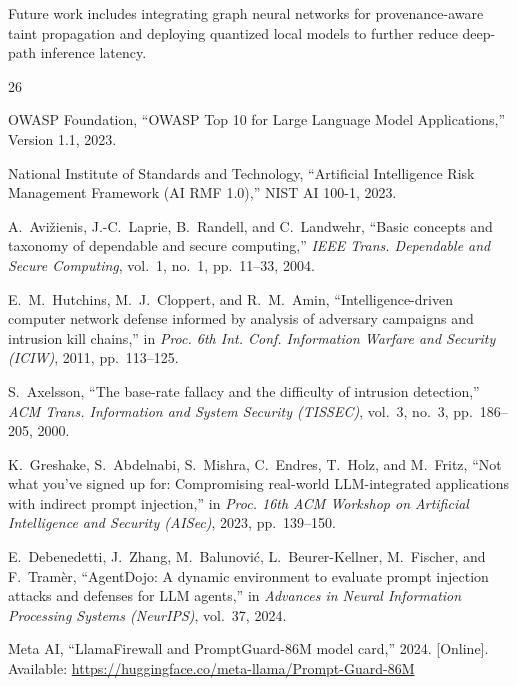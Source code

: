 \documentclass[conference]{IEEEtran}
\begin{document}
Future work includes integrating graph neural networks for provenance-aware taint propagation and deploying quantized local models to further reduce deep-path inference latency.

\begin{thebibliography}{26}

OWASP Foundation, ``OWASP Top 10 for Large Language Model Applications,'' Version 1.1, 2023.

National Institute of Standards and Technology, ``Artificial Intelligence Risk Management Framework (AI RMF 1.0),'' NIST AI 100-1, 2023.

A.~Avi\v{z}ienis, J.-C.~Laprie, B.~Randell, and C.~Landwehr, ``Basic concepts and taxonomy of dependable and secure computing,'' \textit{IEEE Trans. Dependable and Secure Computing}, vol.~1, no.~1, pp.~11--33, 2004.

E.~M.~Hutchins, M.~J.~Cloppert, and R.~M.~Amin, ``Intelligence-driven computer network defense informed by analysis of adversary campaigns and intrusion kill chains,'' in \textit{Proc. 6th Int. Conf. Information Warfare and Security (ICIW)}, 2011, pp.~113--125.

S.~Axelsson, ``The base-rate fallacy and the difficulty of intrusion detection,'' \textit{ACM Trans. Information and System Security (TISSEC)}, vol.~3, no.~3, pp.~186--205, 2000.

K.~Greshake, S.~Abdelnabi, S.~Mishra, C.~Endres, T.~Holz, and M.~Fritz, ``Not what you've signed up for: Compromising real-world LLM-integrated applications with indirect prompt injection,'' in \textit{Proc. 16th ACM Workshop on Artificial Intelligence and Security (AISec)}, 2023, pp.~139--150.

E.~Debenedetti, J.~Zhang, M.~Balunovi{\'c}, L.~Beurer-Kellner, M.~Fischer, and F.~Tram{\`e}r, ``AgentDojo: A dynamic environment to evaluate prompt injection attacks and defenses for LLM agents,'' in \textit{Advances in Neural Information Processing Systems (NeurIPS)}, vol.~37, 2024.

Meta AI, ``LlamaFirewall and PromptGuard-86M model card,'' 2024. [Online]. Available: \url{https://huggingface.co/meta-llama/Prompt-Guard-86M}


\end{thebibliography}
\end{document}
